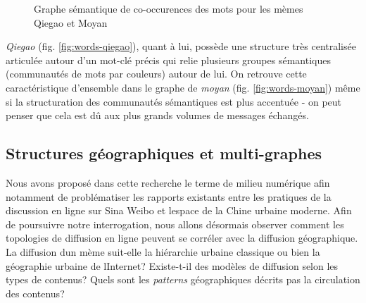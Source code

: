 \begin{figure}
    \centering
    
  \caption{
    Graphe s\'emantique de co-occurences des mots pour les m\`emes Qiegao et Moyan
  }
\end{figure}


\textit{Qiegao} (fig. \ref{fig:words-qiegao}), quant \`a lui, poss\`ede une structure tr\`es centralis\'ee articul\'ee autour d{\textquoteright}un mot-cl\'e pr\'ecis qui relie plusieurs groupes s\'emantiques (communaut\'es de mots par couleurs) autour de lui. On retrouve cette caract\'eristique d{\textquoteright}ensemble dans le graphe de \textit{moyan} (fig. \ref{fig:words-moyan}) m\^eme si la structuration des communaut\'es s\'emantiques est plus accentu\'ee - on peut penser que cela est d\^u aux plus grands volumes de messages \'echang\'es.

\subsection[Structures g\'eographiques et multi{}-graphes]{Structures g\'eographiques et multi-graphes}

Nous avons propos\'e dans cette recherche le terme de milieu num\'erique afin notamment de probl\'ematiser les rapports existants entre les pratiques de la discussion en ligne sur Sina Weibo et l{\textquotesingle}espace de la Chine urbaine moderne. Afin de poursuivre notre interrogation, nous allons d\'esormais observer comment les topologies de diffusion en ligne peuvent se corr\'eler avec la diffusion g\'eographique. La diffusion d{\textquotesingle}un m\`eme suit-elle la hi\'erarchie urbaine classique ou bien la g\'eographie urbaine de l{\textquotesingle}Internet? Existe-t-il des mod\`eles de diffusion selon les types de contenus? Quels sont les \textit{patterns }g\'eographiques d\'ecrits pas la circulation des contenus? 

